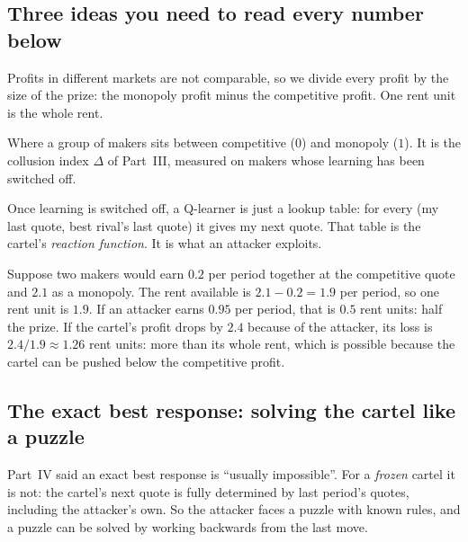 \documentclass[11pt]{article}
\begin{document}
\subsection{Three ideas you need to read every number below}
\begin{description}[style=sameline,leftmargin=0pt,itemsep=3pt]
\item[Rent units] Profits in different markets are not comparable, so we divide every profit by the
size of the prize: the monopoly profit minus the competitive profit. One rent unit is the whole rent.
\item[Rent index $C$] Where a group of makers sits between competitive ($0$) and monopoly ($1$). It is
the collusion index $\Delta$ of Part~III, measured on makers whose learning has been switched off.
\item[Frozen cartel, reaction function] Once learning is switched off, a Q-learner is just a lookup
table: for every (my last quote, best rival's last quote) it gives my next quote. That table is the
cartel's \emph{reaction function}. It is what an attacker exploits.
\end{description}
\begin{example}
Suppose two makers would earn $0.2$ per period together at the competitive quote and $2.1$ as a
monopoly. The rent available is $2.1-0.2=1.9$ per period, so one rent unit is $1.9$. If an attacker earns
$0.95$ per period, that is $0.5$ rent units: half the prize. If the cartel's profit drops by $2.4$
because of the attacker, its loss is $2.4/1.9\approx1.26$ rent units: more than its whole rent, which is
possible because the cartel can be pushed below the competitive profit.
\end{example}

\subsection{The exact best response: solving the cartel like a puzzle}
Part~IV said an exact best response is ``usually impossible''. For a \emph{frozen} cartel it is not:
the cartel's next quote is fully determined by last period's quotes, including the attacker's own. So
the attacker faces a puzzle with known rules, and a puzzle can be solved by working backwards from the
last move.
\end{document}
